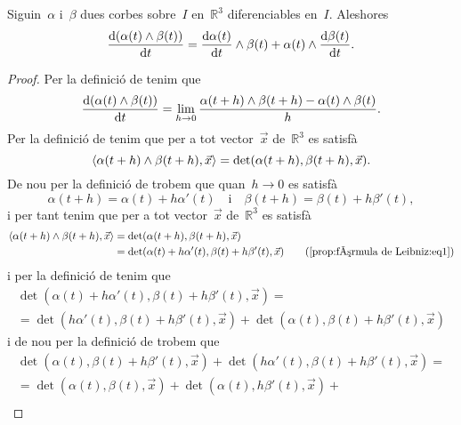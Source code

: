 \documentclass[../../main.tex]{subfiles}
\begin{document}
	\begin{proposition}
		\label{prop:fórmula de Leibniz}
		\label{prop:fórmula per la derivada del producte vectorial de dues corbes}
		Siguin~\(\alpha\) i~\(\beta\) dues corbes sobre~\(I\) en~\(\mathbb{R}^{3}\) diferenciables en~\(I\).
		Aleshores
		\[
		    \frac{\mathop{}\!\mathrm{d}(\alpha(t)\mathbin{\wedge}\beta(t))}{\mathop{}\!\mathrm{d} t}=\frac{\mathop{}\!\mathrm{d}\alpha(t)}{\mathop{}\!\mathrm{d} t}\mathbin{\wedge}\beta(t)+\alpha(t)\mathbin{\wedge}\frac{\mathop{}\!\mathrm{d}\beta(t)}{\mathop{}\!\mathrm{d} t}.
		\]
		\begin{proof}
			Per la definició de  tenim que
			\begin{equation}
				\label{prop:fórmula de Leibniz:eq2}
				\frac{\mathop{}\!\mathrm{d}(\alpha(t)\mathbin{\wedge}\beta(t))}{\mathop{}\!\mathrm{d} t}=\lim_{h\to0}\frac{\alpha(t+h)\mathbin{\wedge}\beta(t+h)-\alpha(t)\mathbin{\wedge}\beta(t)}{h}.
			\end{equation}
			Per la definició de  tenim que per a tot vector~\(\vec{x}\) de~\(\mathbb{R}^{3}\) es satisfà
			\[
			    \prodesc{\alpha(t+h)\prodvec\beta(t+h)}{\vec{x}}=\det(\alpha(t+h),\beta(t+h),\vec{x}).
			\]
			De nou per la definició de  trobem que quan~\(h\to0\) es satisfà
			\begin{equation}
				\label{prop:fórmula de Leibniz:eq1}
				\alpha(t+h)=\alpha(t)+h\alpha'(t)\quad\text{i}\quad\beta(t+h)=\beta(t)+h\beta'(t),
			\end{equation}
			i per tant tenim que per a tot vector~\(\vec{x}\) de~\(\mathbb{R}^{3}\) es satisfà
			\begin{align*}
				\prodesc{\alpha(t+h)\prodvec\beta(t+h)}{\vec{x}}&=\det(\alpha(t+h),\beta(t+h),\vec{x}) \\
				&=\det(\alpha(t)+h\alpha'(t),\beta(t)+h\beta'(t),\vec{x}) \tag{\ref{prop:fórmula de Leibniz:eq1}}
			\end{align*}
			i per la definició de  tenim que
			\begin{multline*}
				\det(\alpha(t)+h\alpha'(t),\beta(t)+h\beta'(t),\vec{x})=\\
				=\det(h\alpha'(t),\beta(t)+h\beta'(t),\vec{x})+\det(\alpha(t),\beta(t)+h\beta'(t),\vec{x})
			\end{multline*}
			i de nou per la definició de  trobem que
			\begin{multline*}
				\det(\alpha(t),\beta(t)+h\beta'(t),\vec{x})+\det(h\alpha'(t),\beta(t)+h\beta'(t),\vec{x})=\\
				=\det(\alpha(t),\beta(t),\vec{x})+\det(\alpha(t),h\beta'(t),\vec{x})+\\

\end{multline*}
\end{proof}
\end{proposition}
\end{document}

